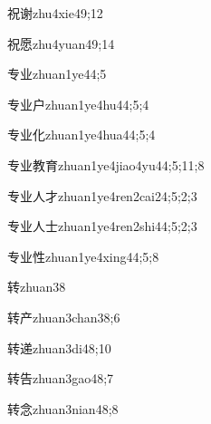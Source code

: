 \begin{verbete}{祝谢}{zhu4xie4}{9;12}
\end{verbete}
\begin{verbete}{祝愿}{zhu4yuan4}{9;14}
\end{verbete}
\begin{verbete}{专业}{zhuan1ye4}{4;5}
\end{verbete}
\begin{verbete}{专业户}{zhuan1ye4hu4}{4;5;4}
\end{verbete}
\begin{verbete}{专业化}{zhuan1ye4hua4}{4;5;4}
\end{verbete}
\begin{verbete}{专业教育}{zhuan1ye4jiao4yu4}{4;5;11;8}
\end{verbete}
\begin{verbete}{专业人才}{zhuan1ye4ren2cai2}{4;5;2;3}
\end{verbete}
\begin{verbete}{专业人士}{zhuan1ye4ren2shi4}{4;5;2;3}
\end{verbete}
\begin{verbete}{专业性}{zhuan1ye4xing4}{4;5;8}
\end{verbete}
\begin{verbete}{转}{zhuan3}{8}
\end{verbete}
\begin{verbete}{转产}{zhuan3chan3}{8;6}
\end{verbete}
\begin{verbete}{转递}{zhuan3di4}{8;10}
\end{verbete}
\begin{verbete}{转告}{zhuan3gao4}{8;7}
\end{verbete}
\begin{verbete}{转念}{zhuan3nian4}{8;8}
\end{verbete}
